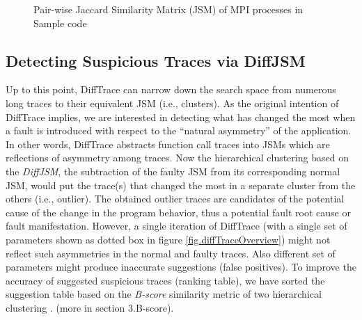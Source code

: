 \begin{figure}[]
\centering
{}
\caption{Pair-wise Jaccard Similarity Matrix (JSM) of MPI processes in Sample code}
\label{fig:jsm2}
\end{figure}


\subsection{Detecting Suspicious Traces via DiffJSM}
Up to this point, DiffTrace can narrow down the search space from numerous long traces to their equivalent JSM (i.e., clusters).
%
As the original intention of DiffTrace implies, we are interested in detecting what has changed the most when a fault is introduced with respect to the ``natural asymmetry'' of the application.
%
In other words, DiffTrace abstracts function call traces into JSMs which are reflections of asymmetry among traces. Now the hierarchical clustering based on the \textit{DiffJSM}, the subtraction of the faulty JSM from its corresponding normal JSM, would put the trace(s) that changed the most in a separate cluster from the others (i.e., outlier).
% 
The obtained outlier traces are candidates of the potential cause of the change in the program behavior, thus a potential fault root cause or fault manifestation.
%
However, a single iteration of DiffTrace (with a single set of parameters shown as dotted box in figure \ref{fig.diffTraceOverview}) might not reflect such asymmetries in the normal and faulty traces. 
%
Also different set of parameters might produce inaccurate suggestions (false positives).
%
To improve the accuracy of suggested suspicious traces (ranking table), we have sorted the suggestion table based on the \textit{B-score} similarity metric of two hierarchical clustering \cite{fowlkes83}. (more in section 3.B-score).

